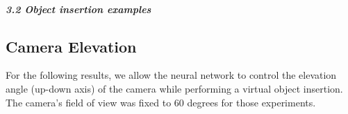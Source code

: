 \protect\hypertarget{camparaminsertionex}{}{}

\hypertarget{object-insertion-examples}{%
\subparagraph{3.2 Object insertion
examples}\label{object-insertion-examples}}

\FloatBarrier
\clearpage
\subsection{Camera Elevation}

For the following results, we allow the neural network to control the
elevation angle (up-down axis) of the camera while performing a virtual
object insertion. The camera's field of view was fixed to 60 degrees for
those experiments.

\begin{multicols}{2}


\end{multicols}
